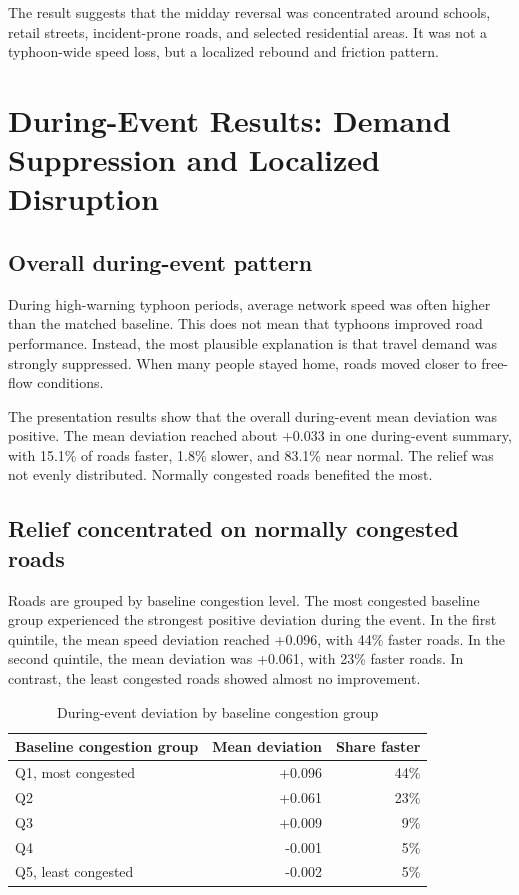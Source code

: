 \documentclass[12pt,a4paper]{report}
\begin{document}
The result suggests that the midday reversal was concentrated around schools, retail streets, incident-prone roads, and selected residential areas. It was not a typhoon-wide speed loss, but a localized rebound and friction pattern.

\chapter{During-Event Results: Demand Suppression and Localized Disruption}

\section{Overall during-event pattern}
During high-warning typhoon periods, average network speed was often higher than the matched baseline. This does not mean that typhoons improved road performance. Instead, the most plausible explanation is that travel demand was strongly suppressed. When many people stayed home, roads moved closer to free-flow conditions.

The presentation results show that the overall during-event mean deviation was positive. The mean deviation reached about +0.033 in one during-event summary, with 15.1\% of roads faster, 1.8\% slower, and 83.1\% near normal. The relief was not evenly distributed. Normally congested roads benefited the most.

\section{Relief concentrated on normally congested roads}
Roads are grouped by baseline congestion level. The most congested baseline group experienced the strongest positive deviation during the event. In the first quintile, the mean speed deviation reached +0.096, with 44\% faster roads. In the second quintile, the mean deviation was +0.061, with 23\% faster roads. In contrast, the least congested roads showed almost no improvement.

\begin{table}[H]
\centering
\caption{During-event deviation by baseline congestion group}
\begin{tabular}{lrr}
\toprule
Baseline congestion group & Mean deviation & Share faster \\
\midrule
Q1, most congested & +0.096 & 44\% \\
Q2 & +0.061 & 23\% \\
Q3 & +0.009 & 9\% \\
Q4 & -0.001 & 5\% \\
Q5, least congested & -0.002 & 5\% \\
\bottomrule
\end{tabular}
\end{table}
\end{document}
